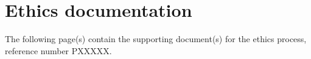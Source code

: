 
\chapter{Ethics documentation}

The following page(s) contain the supporting document(s) for the ethics process, reference number PXXXXX.



